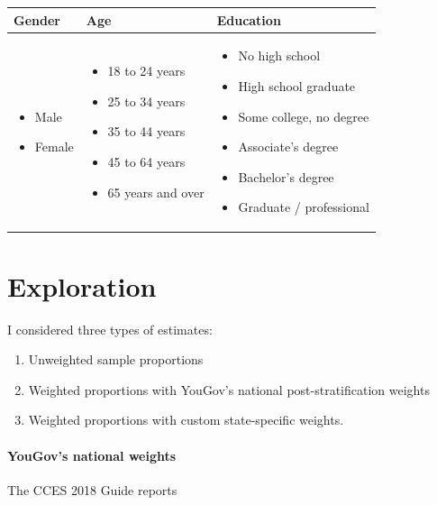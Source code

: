 \documentclass[11pt]{article}
\begin{document}
\begin{table}[!h]
\small
\begin{tabularx}{\linewidth}{XXX}
Gender & Age & Education\\\midrule
\begin{itemize}
\item Male
\item Female
\end{itemize} &
\begin{itemize}
\item 18 to 24 years
\item 25 to 34 years
\item 35 to 44 years
\item 45 to 64 years
\item 65 years and over
\end{itemize} &
\begin{itemize}
\item No high school
\item High school graduate
\item Some college, no degree
\item Associate's degree
\item Bachelor's degree
\item Graduate / professional
\end{itemize}
\end{tabularx}
\end{table}

\section*{Exploration}

I considered three types of estimates:

\begin{enumerate}
\item Unweighted sample proportions
\item Weighted proportions with YouGov's national post-stratification weights
\item Weighted proportions with custom state-specific weights. 
\end{enumerate}

\paragraph{YouGov's national weights} The CCES 2018 Guide  reports
\end{document}
